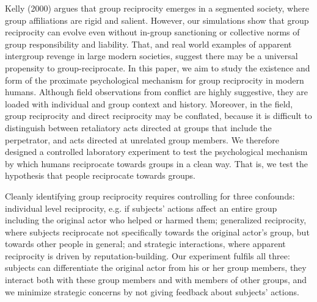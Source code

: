 \documentclass[12pt,a4paper]{article}\usepackage[]{graphicx}\usepackage[]{color}
\begin{document}
Kelly (2000) argues that group reciprocity emerges in a segmented society, where group affiliations are rigid and salient.
However, our simulations show that group reciprocity can evolve even without in-group sanctioning or collective norms of
group responsibility and liability. That, and real world examples of apparent intergroup revenge in large modern societies,
suggest there may be a universal propensity to group-reciprocate. In this paper, we aim to study the existence and form of the proximate
psychological mechanism for group reciprocity in modern humans. Although field observations from conflict are highly 
suggestive, they are loaded with individual and group context and history. Moreover, in the field, group 
reciprocity and direct reciprocity may be conflated, because 
it is difficult to distinguish between retaliatory acts directed at groups that include the perpetrator, and acts 
directed at unrelated group members. We therefore designed a controlled laboratory experiment to test the psychological
mechanism by which humans reciprocate towards groups in a clean way. That is, we test the hypothesis that people 
reciprocate towards groups.
 

Cleanly identifying group reciprocity requires controlling for three confounds: individual level reciprocity, e.g. if
subjects' actions affect an entire group including the original actor who helped or harmed them; generalized reciprocity,
where subjects reciprocate not specifically towards the original actor’s group, but towards other people in general; and
strategic interactions, where apparent reciprocity is driven by reputation-building. 
Our experiment fulfils all three: subjects can differentiate the original actor from his or her group members, they 
interact both with these group members and with members of other groups, and we minimize strategic concerns by not giving
feedback about subjects' actions.
\end{document}
